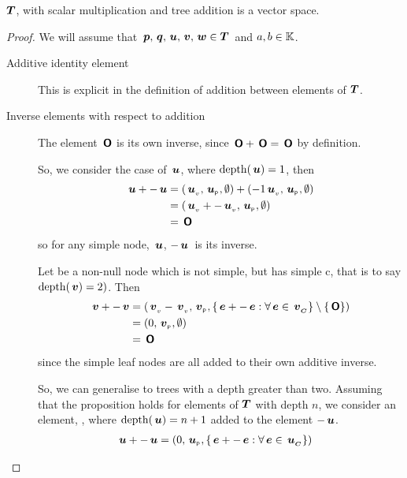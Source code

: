 \begin{proposition}\label{vspace} $\boldsymbol{T}$, with scalar multiplication
  and tree addition is a vector space.
  \begin{proof}
    We will assume that  \(\,\boldsymbol{p}, \,\boldsymbol{q}, \,\boldsymbol{u},\,\boldsymbol{v},\,\boldsymbol{w} \in \boldsymbol{T}\)\ and \(a, b \in  \mathbb{K}\).

    \begin{description} 
    \item[Additive identity element]\label{additiveidentity}

      This is explicit in the definition of addition between elements
      of $\boldsymbol{T}$.

    \item[Inverse elements with respect to addition]

      The element \(\,\boldsymbol{\mathsf{O}}\) is its own inverse, since \(\,\boldsymbol{\mathsf{O}}
      + \,\boldsymbol{\mathsf{O}} = \,\boldsymbol{\mathsf{O}}\) by definition.

      So, we consider the case of $\,\boldsymbol{u}$, where \(\operatorname{depth}(\,\boldsymbol{u})
      = 1\), then
      \begin{align*}
          \,\boldsymbol{u} + -\,\boldsymbol{u} &=  \left({{\,\boldsymbol{u}}_{{}_{v}}},{{\,\boldsymbol{u}}_{{}_{\mathsf{P}}}}, {\emptyset}\right) + \left({-1{\,\boldsymbol{u}}_{{}_{v}}},{{\,\boldsymbol{u}}_{{}_{\mathsf{P}}}}, {\emptyset}\right) \\
          &= ({\,\boldsymbol{u}}_{{}_{v}} + -{\,\boldsymbol{u}}_{{}_{v}}, {\,\boldsymbol{u}}_{{}_{\mathsf{P}}}, \emptyset) \\
          &= \,\boldsymbol{\mathsf{O}}
      \end{align*}
      so for any simple node, \(\,\boldsymbol{u}\), \(-\,\boldsymbol{u}\)\ is its
      inverse.

      Let  be a non-null node which is not simple, but has
      simple c, that is to say \(\operatorname{depth}(\,\boldsymbol{v}) = 2)\).  Then 
      \begin{align*}
          \,\boldsymbol{v} + -\,\boldsymbol{v} &= ({\,\boldsymbol{v}}_{{}_{v}} - {\,\boldsymbol{v}}_{{}_{v}}, {\,\boldsymbol{v}}_{{}_{\mathsf{P}}}, \lbrace \,\boldsymbol{e} + -\,\boldsymbol{e}: \forall \,\boldsymbol{e} \in {\,\boldsymbol{v}}_{{}_{\boldsymbol{C}}}\rbrace \setminus\{\,\boldsymbol{\mathsf{O}}\}) \\
          &= (0, {\,\boldsymbol{v}}_{{}_{\mathsf{P}}}, \emptyset) \\
          &= \,\boldsymbol{\mathsf{O}}
      \end{align*}
      since the simple leaf nodes are all added to their own additive
      inverse.

      So, we can generalise to trees with a depth
      greater than two. Assuming that the proposition holds for
      elements of $\boldsymbol{T}$ with depth \(n\), we consider an element, ,
      where \(\operatorname{depth}(\,\boldsymbol{u}) = n+1\) added to the element
      \(-\,\boldsymbol{u}\).
      \begin{align*}
          \,\boldsymbol{u} + -\,\boldsymbol{u} &= (0, {\,\boldsymbol{u}}_{{}_{\mathsf{P}}}, \lbrace \,\boldsymbol{e} + -\,\boldsymbol{e}: \forall \,\boldsymbol{e} \in {\,\boldsymbol{u}}_{{}_{\boldsymbol{C}}}\rbrace)
      \end{align*}


\end{description}
\end{proof}
\end{proposition}
